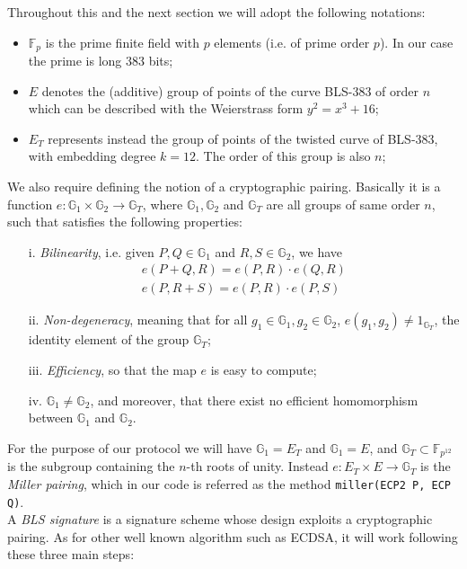 \documentclass[twocolumn]{article}
\begin{document}
Throughout this and the next section we will adopt the following notations: 
\begin{itemize}
    \item $\mathbb{F}_p$ is the prime finite field with $p$ elements (i.e. of prime order $p$). In our case the prime is long 383 bits;
    \item $E$ denotes the (additive) group of points of the curve BLS-383 of order $n$ which can be described with the Weierstrass form  $y^2=x^3 + 16$; 
    \item $E_T$ represents instead the group of points of the twisted curve of BLS-383, with embedding degree $k=12$. The order of this group is also $n$;
\end{itemize}
We also require defining the notion of a cryptographic pairing. Basically it is a function $e: \mathbb{G}_1\times\mathbb{G}_2\to \mathbb{G}_T$, where $\mathbb{G}_1,\mathbb{G}_2$ and $\mathbb{G}_T$ are all groups of same order $n$, such that satisfies the following properties:
\begin{itemize}
    \item [i.] \emph{Bilinearity}, i.e. given $P,Q\in\mathbb{G}_1$ and $R,S\in\mathbb{G}_2$, we have 
    \begin{align*}
        e(P+Q,R) = e(P,R)\cdot e(Q,R) \\
        e(P,R+S) = e(P,R)\cdot e(P,S)
    \end{align*}
    \item[ii.] \emph{Non-degeneracy}, meaning that for all $g_1\in\mathbb{G}_1, g_2\in\mathbb{G}_2$, $e(g_1,g_2)\ne 1_{\mathbb{G}_T}$, the identity element of the group $\mathbb{G}_T$;
    \item[iii.] \emph{ Efficiency}, so that the map $e$ is easy to compute;
    \item[iv. ] $\mathbb{G}_1\ne \mathbb{G}_2$, and moreover, that there exist no efficient homomorphism between $\mathbb{G}_1$ and $\mathbb{G}_2$.
\end{itemize}
For the purpose of our protocol we will have $\mathbb{G}_1 = E_T$ and $\mathbb{G}_1 = E$, and $\mathbb{G}_T\subset \mathbb{F}_{p^{12}}$ is the subgroup containing the $n$-th roots of unity. Instead $e: E_T  \times E\to \mathbb{G}_T$ is the \emph{Miller pairing}, which in our code is referred as the method \verb!miller(ECP2 P, ECP Q)!. \\
A \emph{BLS signature} is a signature scheme whose design exploits a cryptographic pairing. As for other well known algorithm such as ECDSA, it will work following these three main steps:
\end{document}
